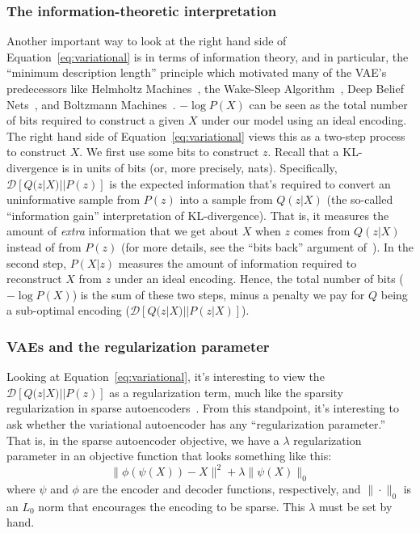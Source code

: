 \documentclass[a4paper, 11pt]{article} %
\begin{document}
\subsubsection{The information-theoretic interpretation} Another important way to look at the right hand side of Equation~\ref{eq:variational} is in terms of information theory, and in particular, the ``minimum description length'' principle which motivated many of the VAE's predecessors like Helmholtz Machines~\cite{dayan1995helmholtz}, the Wake-Sleep Algorithm~\cite{hinton1995wake}, Deep Belief Nets~\cite{hinton2006fast}, and Boltzmann Machines~\cite{salakhutdinov2009deep}.
$-\log P(X)$ can be seen as the total number of bits required to construct a given $X$ under our model using an ideal encoding.
The right hand side of Equation~\ref{eq:variational} views this as a two-step process to construct $X$.
We first use some bits to construct $z$.
Recall that a KL-divergence is in units of bits (or, more precisely, nats).
Specifically, $\mathcal{D}[Q(z|X)||P(z)]$ is the expected information that's required to convert an uninformative sample from $P(z)$ into a sample from $Q(z|X)$ (the so-called ``information gain'' interpretation of KL-divergence).
That is, it measures the amount of \textit{extra} information that we get about $X$ when $z$ comes from $Q(z|X)$ instead of from $P(z)$ (for more details, see the ``bits back'' argument of~\cite{hinton1993keeping,hinton1994autoencoders}).
In the second step, $P(X|z)$ measures the amount of information required to reconstruct $X$ from $z$ under an ideal encoding.  
Hence, the total number of bits ($-\log P(X)$) is the sum of these two steps, minus a penalty we pay for $Q$ being a sub-optimal encoding ($\mathcal{D}[Q(z|X)||P(z|X)]$).

\subsubsection{VAEs and the regularization parameter} Looking at Equation~\ref{eq:variational}, it's interesting to view the $\mathcal{D}[Q(z|X)||P(z)]$ as a regularization term, much like the sparsity regularization in sparse autoencoders~\cite{olshausen1996emergence}.
From this standpoint, it's interesting to ask whether the variational autoencoder has any ``regularization parameter.''
That is, in the sparse autoencoder objective, we have a $\lambda$ regularization parameter in an objective function that looks something like this:
\begin{equation}
 \|\phi(\psi(X))-X\|^{2}+\lambda \|\psi(X)\|_0
\end{equation}
where $\psi$ and $\phi$ are the encoder and decoder functions, respectively, and $\|\cdot\|_0$ is an $L_{0}$ norm that encourages the encoding to be sparse.  
This $\lambda$ must be set by hand.
\end{document}
